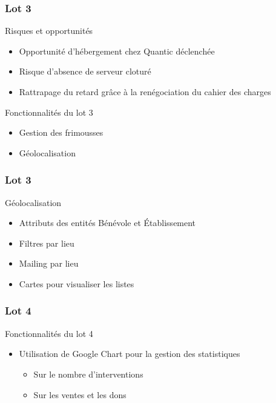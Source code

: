 \speaker{\Francois}

\begin{frame}
	\frametitle{Lot 3}
	\begin{block}{Risques et opportunités}
		\begin{itemize}
			\item Opportunité d'hébergement chez Quantic déclenchée
			\item Risque d'absence de serveur cloturé
			\item Rattrapage du retard grâce à la renégociation du cahier des charges
		\end{itemize}
	\end{block}
	\begin{block}{Fonctionnalités du lot 3}
		\begin{itemize}
			\item Gestion des frimousses
			\item Géolocalisation
		\end{itemize}
	\end{block}
\end{frame}

\begin{frame}
	\frametitle{Lot 3}
	\begin{block}{Géolocalisation}
		\begin{itemize}
			\item Attributs des entités Bénévole et Établissement
			\item Filtres par lieu
			\item Mailing par lieu
			\item Cartes pour visualiser les listes
		\end{itemize}
	\end{block}
\end{frame}

\begin{frame}
	\frametitle{Lot 4}
	\begin{block}{Fonctionnalités du lot 4}
		\begin{itemize}
			\item Utilisation de Google Chart pour la gestion des statistiques 
			\begin{itemize}
				\item Sur le nombre d'interventions
				\item Sur les ventes et les dons
			\end{itemize}
		\end{itemize} 
	\end{block}
\end{frame}